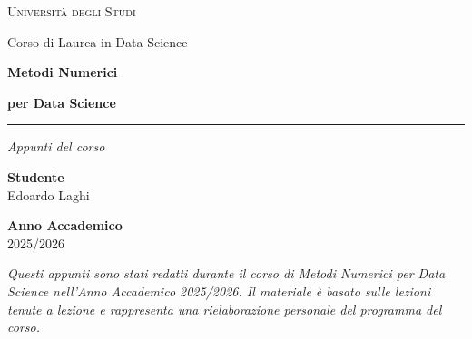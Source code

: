 \documentclass[12pt, a4paper, twoside]{book}
\theoremstyle{plain}
\theoremstyle{definition}
\begin{document}
\begin{titlepage}
  \centering
  \vspace*{2cm}

  {\Large\scshape Università degli Studi\par}
  \vspace{0.5cm}
  {\large Corso di Laurea in Data Science\par}

  \vspace{3cm}

  {\Huge\bfseries Metodi Numerici\par}
  {\Huge\bfseries per Data Science\par}

  \vspace{0.5cm}
  \rule{0.6\textwidth}{0.4pt}

  \vspace{1cm}
  {\large\itshape Appunti del corso\par}

  \vfill

  \begin{minipage}{0.45\textwidth}
    \begin{flushleft}
      \textbf{Studente}\\
      Edoardo Laghi
    \end{flushleft}
  \end{minipage}
  \hfill
  \begin{minipage}{0.45\textwidth}
    \begin{flushright}
      \textbf{Anno Accademico}\\
      2025/2026
    \end{flushright}
  \end{minipage}

  \vspace{2cm}
\end{titlepage}

\thispagestyle{empty}
\null\vfill
\noindent
\textit{Questi appunti sono stati redatti durante il corso di Metodi Numerici per Data
Science nell'Anno Accademico 2025/2026. Il materiale è basato sulle lezioni tenute a
lezione e rappresenta una rielaborazione personale del programma del corso.}
\end{document}
